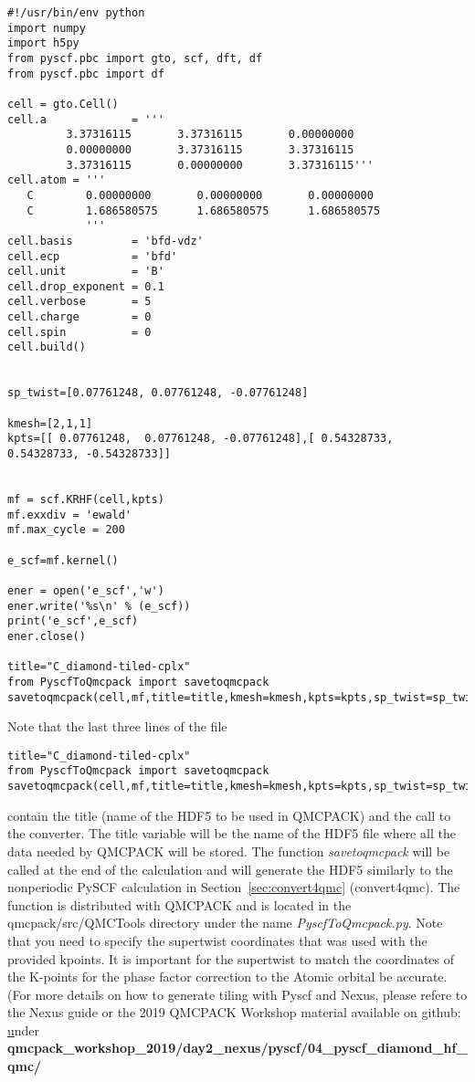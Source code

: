 \begin{lstlisting}[style=Python,caption=Example PySCF input for single k-point calculation for a $2 \times 1 \times 1$ carbon supercell.]
#!/usr/bin/env python
import numpy
import h5py
from pyscf.pbc import gto, scf, dft, df
from pyscf.pbc import df

cell = gto.Cell()
cell.a             = '''
         3.37316115       3.37316115       0.00000000
         0.00000000       3.37316115       3.37316115
         3.37316115       0.00000000       3.37316115'''
cell.atom = '''  
   C        0.00000000       0.00000000       0.00000000
   C        1.686580575      1.686580575      1.686580575 
            '''
cell.basis         = 'bfd-vdz'
cell.ecp           = 'bfd'
cell.unit          = 'B'
cell.drop_exponent = 0.1
cell.verbose       = 5
cell.charge        = 0
cell.spin          = 0
cell.build()


sp_twist=[0.07761248, 0.07761248, -0.07761248]

kmesh=[2,1,1]
kpts=[[ 0.07761248,  0.07761248, -0.07761248],[ 0.54328733,  0.54328733, -0.54328733]]


mf = scf.KRHF(cell,kpts)
mf.exxdiv = 'ewald'
mf.max_cycle = 200

e_scf=mf.kernel()

ener = open('e_scf','w')
ener.write('%s\n' % (e_scf))
print('e_scf',e_scf)
ener.close()

title="C_diamond-tiled-cplx"
from PyscfToQmcpack import savetoqmcpack
savetoqmcpack(cell,mf,title=title,kmesh=kmesh,kpts=kpts,sp_twist=sp_twist)

\end{lstlisting}

Note that the last three lines of the file
\begin{lstlisting}[style=Python]
title="C_diamond-tiled-cplx"
from PyscfToQmcpack import savetoqmcpack
savetoqmcpack(cell,mf,title=title,kmesh=kmesh,kpts=kpts,sp_twist=sp_twist)
\end{lstlisting}

contain the title (name of the HDF5 to be used in QMCPACK) and the call to the converter. The title variable will be the name of the
HDF5 file where all the data needed by QMCPACK will be stored.  The
function \textit{savetoqmcpack} will be called at the end of the
calculation and will generate the HDF5 similarly to the nonperiodic
PySCF calculation in Section~\ref{sec:convert4qmc} (convert4qmc). The
function is distributed with QMCPACK and is located in the
qmcpack/src/QMCTools directory under the name
\textit{PyscfToQmcpack.py}. Note that you need to specify the supertwist coordinates that was used with the provided kpoints. It is important for the supertwist to match the coordinates of the K-points for the phase factor correction to the Atomic orbital be accurate. (For more details on how to generate tiling with Pyscf and Nexus, please refere to the Nexus guide or the 2019 QMCPACK Workshop material available on github: \href{https://github.com/QMCPACK/qmcpack_workshop_2019} under \textbf{qmcpack_workshop_2019/day2_nexus/pyscf/04_pyscf_diamond_hf_qmc/}

